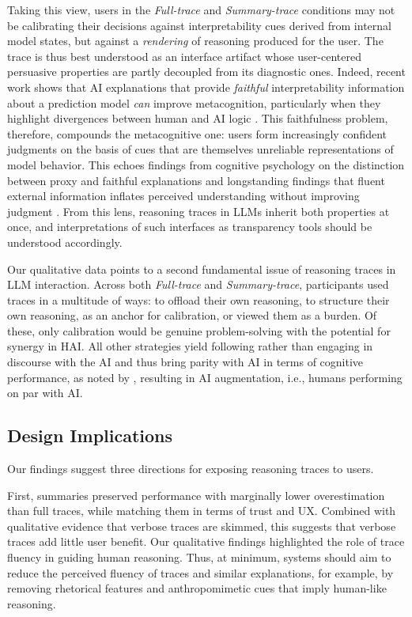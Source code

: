 \documentclass[manuscript, anonymous=false,authorversion,review=false]{acmart}
\begin{document}
Taking this view, users in the \textit{Full-trace} and \textit{Summary-trace} conditions may not be calibrating their decisions against interpretability cues derived from internal model states, but against a \textit{rendering} of reasoning produced for the user. The trace is thus best understood as an interface artifact whose user-centered persuasive properties are partly decoupled from its diagnostic ones. Indeed, recent work shows that AI explanations that provide \textit{faithful} interpretability information about a prediction model \textit{can} improve metacognition, particularly when they highlight divergences between human and AI logic \cite{von2025knowing}. This faithfulness problem, therefore, compounds the metacognitive one: users form increasingly confident judgments on the basis of cues that are themselves unreliable representations of model behavior. This echoes findings from cognitive psychology on the distinction between proxy and faithful explanations \cite{rozenblit2002misunderstood} and longstanding findings that fluent external information inflates perceived understanding without improving judgment \cite{alter2009uniting}. From this lens, reasoning traces in LLMs inherit both properties at once, and interpretations of such interfaces as transparency tools should be understood accordingly.%


Our qualitative data points to a second fundamental issue of reasoning traces in LLM interaction. Across both \textit{Full-trace} and \textit{Summary-trace}, participants used traces in a multitude of ways: to offload their own reasoning, to structure their own reasoning, as an anchor for calibration, or viewed them as a burden. Of these, only calibration would be genuine problem-solving with the potential for synergy in HAI. All other strategies yield following rather than engaging in discourse with the AI and thus bring parity with AI in terms of cognitive performance, as noted by \citet{vaccaro2024combinations}, resulting in AI augmentation, i.e., humans performing on par with AI. 


\subsection{Design Implications}
Our findings suggest three directions for exposing reasoning traces to users. 

First, summaries preserved performance with marginally lower overestimation than full traces, while matching them in terms of trust and UX. Combined with qualitative evidence that verbose traces are skimmed, this suggests that verbose traces add little user benefit. Our qualitative findings highlighted the role of trace fluency in guiding human reasoning. Thus, at minimum, systems should aim to reduce the perceived fluency of traces and similar explanations, for example, by removing rhetorical features and anthropomimetic cues that imply human-like reasoning. 
\end{document}
